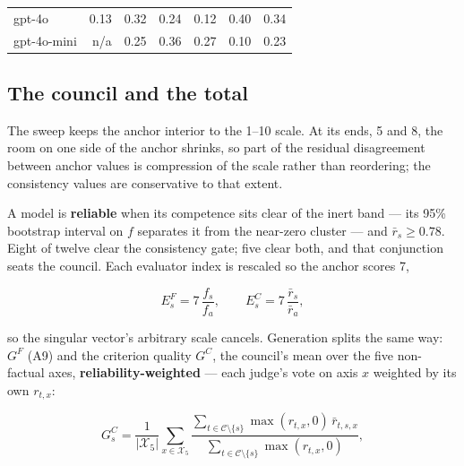 \documentclass{article}
\begin{document}
\begin{table}[H]
\begin{center}
{\begin{tabular}{@{}lrrrrrr@{}}
gpt-4o &\cellcolor[HTML]{EBF7B1}\textcolor[HTML]{000000}{0.13}&\cellcolor[HTML]{9FD9B8}\textcolor[HTML]{000000}{0.32}&\cellcolor[HTML]{CAEAB4}\textcolor[HTML]{000000}{0.24}&\cellcolor[HTML]{EEF8B3}\textcolor[HTML]{000000}{0.12}&\cellcolor[HTML]{73C8BD}\textcolor[HTML]{000000}{0.40}&\cellcolor[HTML]{93D5B9}\textcolor[HTML]{000000}{0.34} \\
gpt-4o-mini & n/a &\cellcolor[HTML]{C7E9B4}\textcolor[HTML]{000000}{0.25}&\cellcolor[HTML]{88D0BA}\textcolor[HTML]{000000}{0.36}&\cellcolor[HTML]{BBE5B5}\textcolor[HTML]{000000}{0.27}&\cellcolor[HTML]{F1F9B9}\textcolor[HTML]{000000}{0.10}&\cellcolor[HTML]{CDEBB4}\textcolor[HTML]{000000}{0.23} \\
\bottomrule
\end{tabular}}
\end{center}
\end{table}

\subsection{The council and the total}\label{the-council-and-the-total}

The sweep keeps the anchor interior to the 1--10 scale. At its ends, 5 and 8, the room on one side of the anchor shrinks, so part of the residual disagreement between anchor values is compression of the scale rather than reordering; the consistency values are conservative to that extent.

A model is \textbf{reliable} when its competence sits clear of the inert band --- its 95\% bootstrap interval on \(f\) separates it from the near-zero cluster --- and \(\bar r_s\ge0.78\). Eight of twelve clear the consistency gate; five clear both, and that conjunction seats the council. Each evaluator index is rescaled so the anchor scores 7,

\[ E^{F}_s=7\,\frac{f_s}{f_a},\qquad E^{C}_s=7\,\frac{\bar r_s}{\bar r_a}, \tag{A12}\]

so the singular vector's arbitrary scale cancels. Generation splits the same way: \(G^{F}\) (A9) and the criterion quality \(G^{C}\), the council's mean over the five non-factual axes, \textbf{reliability-weighted} --- each judge's vote on axis \(x\) weighted by its own \(r_{t,x}\):

\[ G^{C}_s=\frac{1}{|\mathcal{X}_{5}|}\sum_{x\in\mathcal{X}_{5}}\frac{\sum_{t\in\mathcal{C}\setminus\{s\}}\max(r_{t,x},0)\,\bar r_{t,s,x}}{\sum_{t\in\mathcal{C}\setminus\{s\}}\max(r_{t,x},0)}, \tag{A12b}\]
\end{document}
